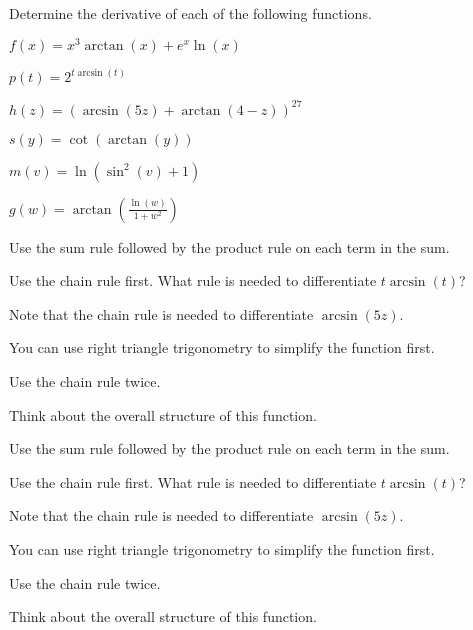 \begin{activity} \label{A:2.8.3}   Determine the derivative of each of the following functions.
\ba
	  \item $\displaystyle f(x) = x^3 \arctan(x) + e^x \ln(x)$
           \item $\displaystyle p(t) = 2^{t\arcsin(t)}$
           \item $\displaystyle h(z) = (\arcsin(5z) + \arctan(4-z))^{27}$
  	  \item $\displaystyle s(y) = \cot(\arctan(y))$
  	  \item $\displaystyle m(v) = \ln(\sin^2(v)+1)$
  	 \item $\displaystyle g(w) = \arctan\left( \frac{\ln(w)}{1+w^2} \right)$
\ea
\end{activity}
\begin{smallhint}
\ba
	\item Use the sum rule followed by the product rule on each term in the sum.
	\item Use the chain rule first.  What rule is needed to differentiate $t\arcsin(t)$?
	\item Note that the chain rule is needed to differentiate $\arcsin(5z)$.
	\item You can use right triangle trigonometry to simplify the function first.
	\item Use the chain rule twice.
	\item Think about the overall structure of this function.
\ea
\end{smallhint}
\begin{bighint}
\ba
	\item Use the sum rule followed by the product rule on each term in the sum.
	\item Use the chain rule first.  What rule is needed to differentiate $t\arcsin(t)$?
	\item Note that the chain rule is needed to differentiate $\arcsin(5z)$.
	\item You can use right triangle trigonometry to simplify the function first.
	\item Use the chain rule twice.
	\item Think about the overall structure of this function.
\ea
\end{bighint}
